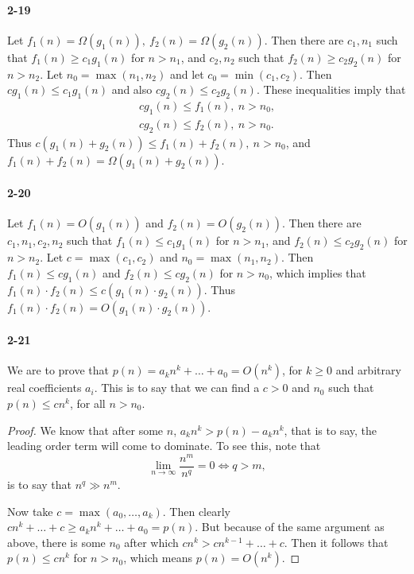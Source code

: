 \documentclass{report}
\begin{document}
\paragraph{2-19} Let $f_1(n) = \Omega(g_1(n)),\ f_2(n) = \Omega(g_2(n))$. Then there are $c_1, n_1$ such that $f_1(n) \ge c_1 g_1(n)$ for $n > n_1$, and $c_2, n_2$ such that $f_2(n) \ge c_2 g_2(n)$ for $n > n_2$. Let $n_0 = \max(n_1, n_2)$ and let $c_0 = \min(c_1, c_2)$. Then $c g_1(n) \le c_1 g_1(n)$ and also $c g_2(n) \le c_2 g_2(n)$. These inequalities imply that
\begin{gather*}
	c g_1(n) \le f_1(n),\ n > n_0, \\
	c g_2(n) \le f_2(n),\ n > n_0.
\end{gather*}
Thus $c(g_1(n) + g_2(n)) \le f_1(n) + f_2(n),\ n > n_0$, and $f_1(n) + f_2(n) = \Omega(g_1(n) + g_2(n))$.

\paragraph{2-20} Let $f_1(n) = O(g_1(n))$ and $f_2(n) = O(g_2(n))$. Then there are $c_1, n_1, c_2, n_2$ such that $f_1(n) \le c_1 g_1(n)$ for $n > n_1$, and $f_2(n) \le c_2 g_2(n)$ for $n > n_2$. Let $c = \max(c_1, c_2)$ and $n_0 = \max(n_1, n_2)$. Then $f_1(n) \le c g_1(n)$ and $f_2(n) \le c g_2(n)$ for $n > n_0$, which implies that $f_1(n)\cdot f_2(n) \le c(g_1(n)\cdot g_2(n))$. Thus $f_1(n)\cdot f_2(n) = O(g_1(n)\cdot g_2(n))$.

\paragraph{2-21} We are to prove that $p(n) = a_k n^k + \ldots + a_0 = O(n^k)$, for $k \ge 0$ and arbitrary real coefficients $a_i$. This is to say that we can find a $c > 0$ and $n_0$ such that $p(n) \le c n^k$, for all $n > n_0$.

\begin{proof}We know that after some $n$, $a_k n^k > p(n) - a_k n^k$, that is to say, the leading order term will come to dominate. To see this, note that
\begin{equation*}\lim_{n\to\infty}\frac{n^m}{n^q} = 0 \Leftrightarrow q > m,\end{equation*}
is to say that $n^q \gg n^m$.

Now take $c = \max(a_0,\ldots, a_k)$. Then clearly $c n^k + \ldots + c \ge a_k n^k + \ldots + a_0 = p(n)$. But because of the same argument as above, there is some $n_0$ after which $c n^k > c n^{k-1} + \ldots + c$. Then it follows that $p(n) \le c n^k$ for $n > n_0$, which means $p(n) = O(n^k)$.
\end{proof}
\end{document}

